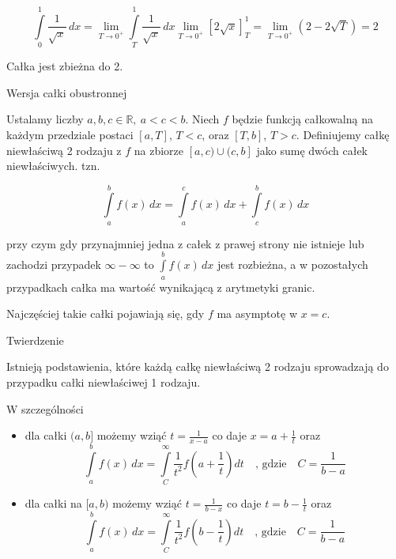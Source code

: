 \begin{przyklad}

\[ \int\limits_{0}^{1} \frac{1}{\sqrt{x}} \,dx = \lim_{T \to 0^+} \int\limits_{T}^{1} \frac{1}{\sqrt{x}} \,dx
\lim_{T \to 0^+} [2\sqrt{x}]_T^1 = \lim_{T \to 0^+} (2 - 2\sqrt{T}) = 2 \]

Całka jest zbieżna do 2.
\end{przyklad}

\begin{tw}{Wersja całki obustronnej}

Ustalamy liczby $ a,b,c \in \mathbb{R}, \ a < c < b $. Niech $f$ będzie funkcją całkowalną na każdym przedziale postaci
$[a,T]$, $T < c$, oraz $ [T, b] $, $ T > c $. Definiujemy całkę niewłaściwą 2 rodzaju z $f$ na zbiorze $[a, c)\cup(c, b] $
jako sumę dwóch całek niewłaściwych. tzn.

\[ \int\limits_{a}^{b} f(x) \,dx = \int\limits_{a}^{c} f(x) \,dx + \int\limits_{c}^{b} f(x) \,dx \]

przy czym gdy przynajmniej jedna z całek z prawej strony nie istnieje lub zachodzi przypadek $ \infty - \infty $ to
$ \int\limits_{a}^{b} f(x) \,dx $ jest rozbieżna, a w pozostałych przypadkach całka ma wartość wynikającą z arytmetyki granic.
\end{tw}

Najczęściej takie całki pojawiają się, gdy $f$ ma asymptotę w $x = c$. \\

\begin{tw}{Twierdzenie}

Istnieją podstawienia, które każdą całkę niewłaściwą 2 rodzaju sprowadzają do przypadku całki niewłaściwej 1 rodzaju.

W szczególności

\begin{itemize}
    \item dla całki $(a,b]$ możemy wziąć $ t = \frac{1}{x - a} $ co daje $ x = a + \frac{1}{t} $ oraz
    $$ \int\limits_{a}^{b} f(x) \,dx = \int\limits_{C}^{\infty} \frac{1}{t^2} f \left(a + \frac{1}{t} \right) dt \quad
    \textrm{, gdzie} \quad C = \frac{1}{b - a} $$

    \item dla całki na $[a,b)$ możemy wziąć $t = \frac{1}{b - x}$ co daje $ t = b - \frac{1}{t} $ oraz
    $$ \int\limits_{a}^{b} f(x) \,dx = \int\limits_{C}^{\infty} \frac{1}{t^2} f \left(b - \frac{1}{t} \right) dt \quad
    \textrm{, gdzie} \quad C = \frac{1}{b - a} $$
\end{itemize}
\end{tw}

